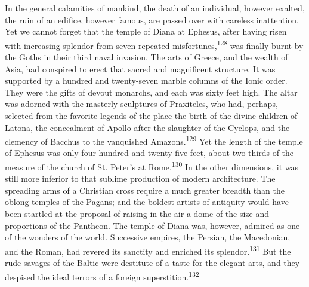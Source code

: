 In the general calamities of mankind, the death of an individual,
however exalted, the ruin of an edifice, however famous, are
passed over with careless inattention. Yet we cannot forget that
the temple of Diana at Ephesus, after having risen with
increasing splendor from seven repeated misfortunes,\textsuperscript{128} was
finally burnt by the Goths in their third naval invasion. The
arts of Greece, and the wealth of Asia, had conspired to erect
that sacred and magnificent structure. It was supported by a
hundred and twenty-seven marble columns of the Ionic order. They
were the gifts of devout monarchs, and each was sixty feet high.
The altar was adorned with the masterly sculptures of Praxiteles,
who had, perhaps, selected from the favorite legends of the place
the birth of the divine children of Latona, the concealment of
Apollo after the slaughter of the Cyclops, and the clemency of
Bacchus to the vanquished Amazons.\textsuperscript{129} Yet the length of the
temple of Ephesus was only four hundred and twenty-five feet,
about two thirds of the measure of the church of St. Peter’s at
Rome.\textsuperscript{130} In the other dimensions, it was still more inferior to
that sublime production of modern architecture. The spreading
arms of a Christian cross require a much greater breadth than the
oblong temples of the Pagans; and the boldest artists of
antiquity would have been startled at the proposal of raising in
the air a dome of the size and proportions of the Pantheon. The
temple of Diana was, however, admired as one of the wonders of
the world. Successive empires, the Persian, the Macedonian, and
the Roman, had revered its sanctity and enriched its splendor.\textsuperscript{131}
But the rude savages of the Baltic were destitute of a taste
for the elegant arts, and they despised the ideal terrors of a
foreign superstition.\textsuperscript{132}





